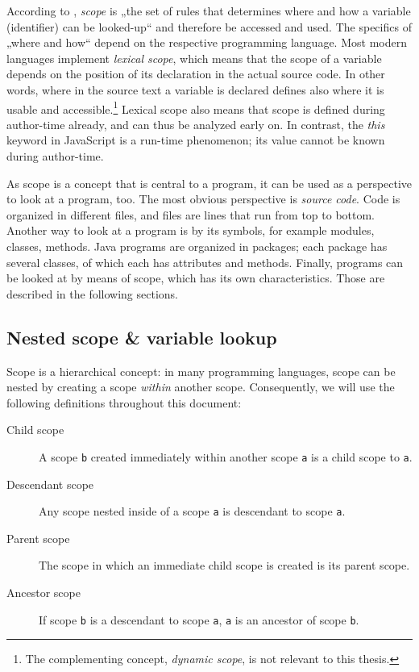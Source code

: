 According to , \emph{scope} is „the set of rules that
determines where and how a variable (identifier) can be looked-up“ and
therefore be accessed and used. The specifics of „where and how“ depend
on the respective programming language. Most modern languages implement
\emph{lexical scope}, which means that the scope of a variable depends
on the position of its declaration in the actual source code. In other
words, where in the source text a variable is declared defines also
where it is usable and
accessible.\footnote{The complementing concept, \emph{dynamic scope}, is not relevant to this thesis.}
Lexical scope also means that scope is defined during author-time
already, and can thus be analyzed early on. In contrast, the \emph{this}
keyword in JavaScript is a run-time phenomenon; its value cannot be
known during author-time.

As scope is a concept that is central to a program, it can be used as a
perspective to look at a program, too. The most obvious perspective is
\emph{source code}. Code is organized in different files, and files are
lines that run from top to bottom. Another way to look at a program is
by its symbols, for example modules, classes, methods. Java programs are
organized in packages; each package has several classes, of which each
has attributes and methods. Finally, programs can be looked at by means
of scope, which has its own characteristics. Those are described in the
following sections.

\subsection{Nested scope \& variable
lookup}\label{nested-scope-variable-lookup}

Scope is a hierarchical concept: in many programming languages, scope
can be nested by creating a scope \emph{within} another scope.
Consequently, we will use the following definitions throughout this
document:

\begin{description}
\item[Child scope]
A scope \texttt{b} created immediately within another scope \texttt{a}
is a child scope to \texttt{a}.
\item[Descendant scope]
Any scope nested inside of a scope \texttt{a} is descendant to scope
\texttt{a}.
\item[Parent scope]
The scope in which an immediate child scope is created is its parent
scope.
\item[Ancestor scope]
If scope \texttt{b} is a descendant to scope \texttt{a}, \texttt{a} is
an ancestor of scope \texttt{b}.
\end{description}

